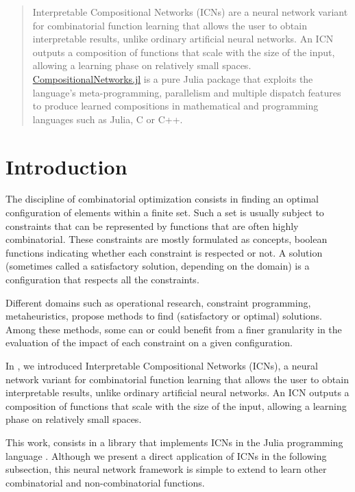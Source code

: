 \documentclass{juliacon}
\newcommand{\cnjl}{\href{https://github.com/JuliaConstraints/CompositionalNetworks.jl}{CompositionalNetworks.jl}\xspace}
\begin{document}


\maketitle

\begin{abstract}
  Interpretable Compositional Networks (ICNs) are a neural network variant for combinatorial function learning that allows the user to obtain interpretable results, unlike ordinary artificial neural networks. An ICN outputs a composition of functions that scale with the size of the input, allowing a learning phase on relatively small spaces.
  \cnjl is a pure Julia package that exploits the language's meta-programming, parallelism and multiple dispatch features to produce learned compositions in mathematical and programming languages such as Julia, C or C++.
\end{abstract}

\section{Introduction}
\label{sec:introduction}

The discipline of combinatorial optimization consists in finding an optimal configuration of elements within a finite set. Such a set is usually subject to constraints that can be represented by functions that are often highly combinatorial. These constraints are mostly formulated as concepts, boolean functions indicating whether each constraint is respected or not. A solution (sometimes called a satisfactory solution, depending on the domain) is a configuration that respects all the constraints.

Different domains such as operational research, constraint programming, metaheuristics, propose methods to find (satisfactory or optimal) solutions. Among these methods, some can or could benefit from a finer granularity in the evaluation of the impact of each constraint on a given configuration.

In \cite{richoux2020automatic}, we introduced Interpretable Compositional Networks (ICNs), a neural network variant for combinatorial function learning that allows the user to obtain interpretable results, unlike ordinary artificial neural networks. An ICN outputs a composition of functions that scale with the size of the input, allowing a learning phase on relatively small spaces.

This work, consists in a library that implements ICNs in the Julia programming language \cite{bezanson2017julia}. Although we present a direct application of ICNs in the following subsection, this neural network framework is simple to extend to learn other combinatorial and non-combinatorial functions.
\end{document}
